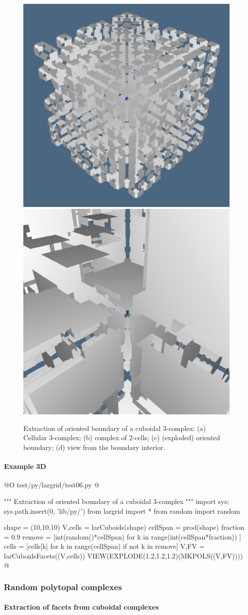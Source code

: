 \documentclass[11pt,oneside]{article}	%
\begin{document}
\begin{figure}[htbp]
   \includegraphics[height=0.245\linewidth,width=0.244\linewidth]{images/3Dsigned2} 
   \includegraphics[height=0.245\linewidth,width=0.244\linewidth]{images/3Dsigned3} 
   \caption{Extraction of oriented boundary of a cuboidal 3-complex: (a) Cellular 3-complex; (b) complex of 2-cells; (c) (exploded) oriented boundary; (d) view from the boundary interior.}
   \label{fig:2-3-complex}
\end{figure}


\paragraph{Example 3D}

@O test/py/largrid/test06.py
@{""" Extraction of oriented boundary of a cuboidal 3-complex """
import sys; sys.path.insert(0, 'lib/py/')
from largrid import *
from random import random

shape = (10,10,10)
V,cells = larCuboids(shape)
cellSpan = prod(shape)
fraction = 0.9
remove = [int(random()*cellSpan) for k in range(int(cellSpan*fraction)) ]
cells = [cells[k] for k in range(cellSpan) if not k in remove]
V,FV = larCuboidsFacets((V,cells))
VIEW(EXPLODE(1.2,1.2,1.2)(MKPOLS((V,FV))))
@}



\subsubsection{Random polytopal complexes}


\paragraph{Extraction of facets from cuboidal complexes}
\end{document}

